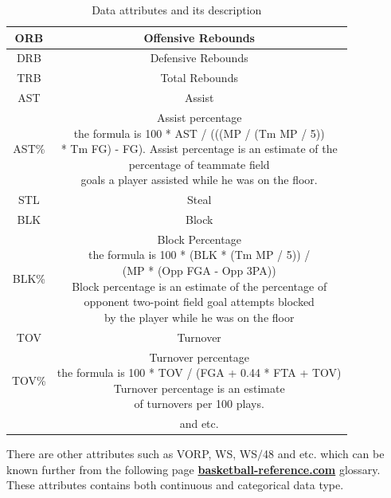 \documentclass[format=sigconf]{acmart}
\begin{document}
\begin{center}
\begin{table}[H]
\begin{tabular}{|c|c|}
            ORB & Offensive Rebounds \\
            \hline
            DRB & Defensive Rebounds \\
            \hline
            TRB & Total Rebounds \\
            \hline
            AST & Assist \\
            \hline
            AST\% & \makecell{Assist percentage \\the formula is 100 * AST / (((MP / (Tm MP / 5))\\ * Tm FG) - FG).
            Assist percentage is an estimate of the \\percentage of teammate field \\goals a player assisted while he was on the floor.} \\
            \hline
            STL & Steal \\
            \hline
            BLK & Block \\
            \hline
            BLK\% & \makecell{Block Percentage \\ the formula is 100 * (BLK * (Tm MP / 5)) /\\ (MP * (Opp FGA - Opp 3PA)) \\
            Block percentage is an estimate of the percentage of \\opponent two-point field goal attempts blocked\\ by the player while he was on the floor}\\
            \hline
            TOV & Turnover \\
            \hline
            TOV\% & \makecell{Turnover percentage \\the formula is 100 * TOV / (FGA + 0.44 * FTA + TOV)\\Turnover percentage is an estimate \\of turnovers per 100 plays.} \\
            \hline
             & and etc. \\
            \hline
        \end{tabular}
        \caption{Data attributes and its description}
        \label{tab:attributesTable}
    \end{table}
\end{center}
There are other attributes such as VORP, WS, WS$/$48 and etc. which can be known further from the following page \textbf{\href{https://www.basketball-reference.com/about/glossary.html}
{basketball-reference.com}} glossary. These attributes contains both continuous and categorical data type.
\end{document}
